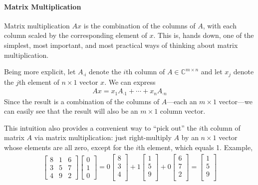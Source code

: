 \documentclass[12pt]{article}
\numberwithin{equation}{section} %
\theoremstyle{plain}
\theoremstyle{definition}
\theoremstyle{remark}
\newcommand{\C}{\mathbb{C}}
\begin{document}
\paragraph{Matrix Multiplication}
Matrix multiplication $Ax$ is the combination of the columns of $A$,
with each column scaled by the corresponding element of $x$. This is,
hands down, one of the simplest, most important, and most practical ways
of thinking about matrix multiplication.

Being more explicit, let $A_{\cdot i}$ denote the $i$th column of $A \in
\C^{m\times n}$ and let $x_j$ denote the $j$th element of $n\times 1$
vector $x$. We can express
\begin{align*}
  A x = x_1 A_{\cdot 1}  + \cdots + x_n A_{\cdot n}
\end{align*}
Since the result is a combination of the columns of $A$---each an
$m\times 1$ vector---we can easily see that the result will also be an
$m\times 1$ column vector.

This intuition also provides a convenient way to ``pick out'' the $i$th
column of matrix $A$ via matrix multiplication: just right-multiply $A$
by an $n \times 1$ vector whose elements are all zero, except for the
$i$th element, which equals 1. Example,
\begin{align*}
  \begin{bmatrix}
  8 & 1 & 6 \\
  3 & 5 & 7 \\
  4 & 9 & 2
  \end{bmatrix}
  \begin{bmatrix}
  0 \\ 1 \\ 0
  \end{bmatrix}
  = 0
  \begin{bmatrix} 8 \\ 3 \\ 4 \\ \end{bmatrix}
  + 1  \begin{bmatrix} 1 \\ 5 \\ 9 \\ \end{bmatrix}
  + 0  \begin{bmatrix} 6 \\ 7 \\ 2 \\ \end{bmatrix}
  =
  \begin{bmatrix} 1 \\ 5 \\ 9 \\ \end{bmatrix}
\end{align*}
\end{document}
